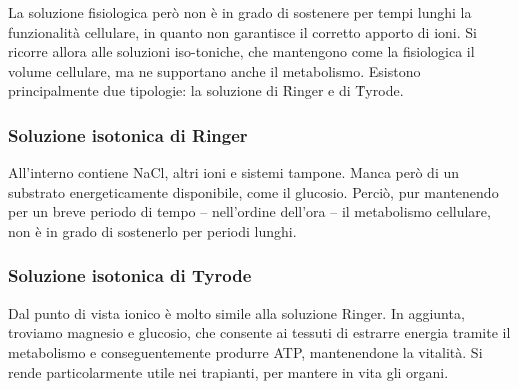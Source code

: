 
La soluzione fisiologica però non è in grado di sostenere per tempi lunghi la funzionalità cellulare, in quanto non garantisce il corretto apporto di ioni. Si ricorre allora alle soluzioni iso-toniche, che mantengono come la fisiologica il volume cellulare, ma ne supportano anche il metabolismo. Esistono principalmente due tipologie: la soluzione di \h{Ringer} e di \h{Tyrode}.

\subsubsection{Soluzione isotonica di Ringer}
All'interno contiene NaCl, altri ioni e sistemi tampone. Manca però di un substrato energeticamente disponibile, come il glucosio. Perciò, pur mantenendo per un breve periodo di tempo -- nell'ordine dell'ora -- il metabolismo cellulare, non è in grado di sostenerlo per periodi lunghi.

\subsubsection{Soluzione isotonica di Tyrode}
Dal punto di vista ionico è molto simile alla soluzione Ringer. In aggiunta, troviamo magnesio e glucosio, che consente ai tessuti di estrarre energia tramite il metabolismo e conseguentemente produrre ATP, mantenendone la vitalità. Si rende particolarmente utile nei trapianti, per mantere in vita gli organi.

